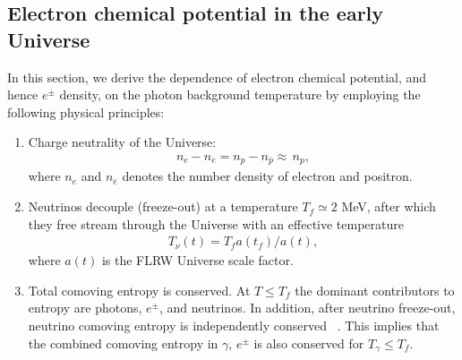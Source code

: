 


\subsection{Electron chemical potential in the early Universe}
In this section, we derive the dependence of electron chemical potential, and hence $e^\pm$ density, on the photon background temperature by employing the following physical principles:
\begin{enumerate}
\item Charge neutrality of the Universe:
\begin{align}\label{neutrality}
n_e-n_{\overline{e}}=n_p-n_{\overline{p}}\approx\,n_p,
\end{align}
where $n_e$ and $n_{\overline{e}}$ denotes the number density of electron and positron.
\item Neutrinos decouple (freeze-out) at a temperature $T_f\simeq 2$ MeV, after which they free stream through the Universe with an effective temperature~\cite{Birrell:2012gg}
\begin{align}
T_\nu(t)=T_f a(t_f)/a(t),
\end{align}
 where $a(t)$ is the FLRW Universe scale factor.
\item Total comoving entropy is conserved. At $T\leq T_f$ the dominant contributors to entropy are photons, $e^\pm$, and neutrinos.
In addition, after neutrino freeze-out, neutrino comoving entropy is independently conserved ~\cite{Birrell:2012gg}. This  implies that the combined comoving entropy in $\gamma$, $e^\pm$ is also conserved for $T_\gamma\leq T_f$.
\end{enumerate}

